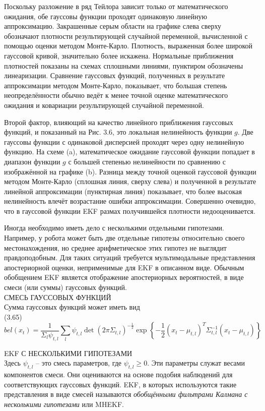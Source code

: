 \documentclass[10pt,a4paper]{article}
\begin{document}
Поскольку разложение в ряд Тейлора зависит только от математического ожидания, обе гауссовы функции проходят одинаковую линейную аппроксимацию. Закрашенные серым области на графике слева сверху обозначают плотности результирующей случайной переменной, вычисленной с помощью оценки методом Монте-Карло. Плотность, выраженная более широкой гауссовой кривой, значительно более искажена. Нормальные приближения плотностей показаны на схемах сплошными линиями, пунктиром обозначены линеаризации. Сравнение гауссовых функций, полученных в результате аппроксимации методом Монте-Карло, показывает, что большая степень неопределённости обычно ведёт к менее точной оценке математического ожидания и ковариации результирующей случайной переменной.

Второй фактор, влияющий на качество линейного приближения гауссовых функций, и показанный на Рис. 3.6, это локальная нелинейность функции $g$. Две гауссовы функции с одинаковой дисперсией проходят через одну нелинейную функцию. На схеме (a), математическое ожидание гауссовой функции попадает в диапазон функции $g$ с большей степенью нелинейности по сравнению с изображённой на графике (b). Разница между точной оценкой гауссовой функции методом Монте-Карло (сплошная линия, сверху слева) и полученной в результате линейной аппроксимации (пунктирная линия) показывает, что более высокая нелинейность влечёт возрастание ошибки аппроксимации. Совершенно очевидно, что в гауссовой функции EKF  размах получившейся плотности недооценивается.

Иногда необходимо иметь дело с несколькими отдельными гипотезами. Например, у робота может быть две отдельные гипотезы относительно своего местонахождения, но среднее арифметическое этих гипотез не выглядит правдоподобным. Для таких ситуаций требуется мультимодальные представления апостериорной оценки, неприменимые для EKF в описанном виде. Обычным обобщением EKF является отображение апостериорных вероятностей, в виде смеси (или суммы) гауссовых функций.\\
СМЕСЬ ГАУССОВЫХ ФУНКЦИЙ\\ 
Сумма гауссовых функций может иметь вид\\

(3.65)
$$bel(x_t)=\frac{1}{\varSigma_l \psi_{t,l}}\sum_l \psi_{t,l}\det(2\pi\varSigma_{t,l})^{-\frac{1}{2}}\exp\left\lbrace -\frac{1}{2}(x_t-\mu_{t,l})^T \varSigma_{t,l}^{-1}(x_t-\mu_{t,l})\right\rbrace$$

EKF С НЕСКОЛЬКИМИ ГИПОТЕЗАМИ\\
Здесь $\psi_{t,l}$ – это смесь параметров, где  $\psi_{t,l}\geq 0$. Эти параметры служат весами компонентов смеси. Они оцениваются на основе подобия наблюдений для соответствующих гауссовых функций. EKF, в которых используются такие представления в виде смесей называются \textit{обобщёнными фильтрами Калмана с несколькими гипотезами} или MHEKF.
\end{document}
